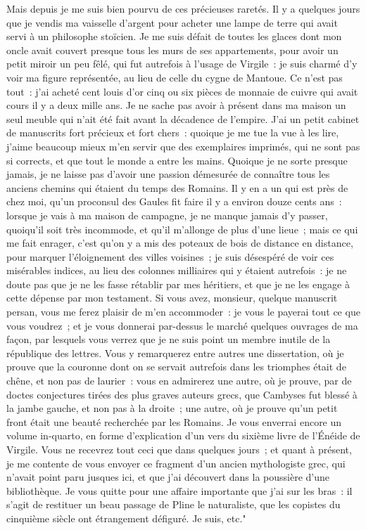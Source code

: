 \documentclass[french,twoside]{book} %
\begin{document}
Mais depuis je me suis bien pourvu de ces précieuses raretés. Il y a quelques jours que je vendis ma vaisselle d’argent pour acheter une lampe de terre qui avait servi à un philosophe stoïcien. Je me suis défait de toutes les glaces dont mon oncle avait couvert presque tous les murs de ses appartements, pour avoir un petit miroir un peu fêlé, qui fut autrefois à l’usage de Virgile : je suis charmé d’y voir ma figure représentée, au lieu de celle du cygne de Mantoue. Ce n’est pas tout : j’ai acheté cent louis d’or cinq ou six pièces de monnaie de cuivre qui avait cours il y a deux mille ans. Je ne sache pas avoir à présent dans ma maison un seul meuble qui n’ait été fait avant la décadence de l’empire. J’ai un petit cabinet de manuscrits fort précieux et fort chers : quoique je me tue la vue à les lire, j’aime beaucoup mieux m’en servir que des exemplaires imprimés, qui ne sont pas si corrects, et que tout le monde a entre les mains. Quoique je ne sorte presque jamais, je ne laisse pas d’avoir une passion démesurée de connaître tous les anciens chemins qui étaient du temps des Romains. Il y en a un qui est près de chez moi, qu’un proconsul des Gaules fit faire il y a environ douze cents ans : lorsque je vais à ma maison de campagne, je ne manque jamais d’y passer, quoiqu’il soit très incommode, et qu’il m’allonge de plus d’une lieue ; mais ce qui me fait enrager, c’est qu’on y a mis des poteaux de bois de distance en distance, pour marquer l’éloignement des villes voisines ; je suis désespéré de voir ces misérables indices, au lieu des colonnes milliaires qui y étaient autrefois : je ne doute pas que je ne les fasse rétablir par mes héritiers, et que je ne les engage à cette dépense par mon testament. Si vous avez, monsieur, quelque manuscrit persan, vous me ferez plaisir de m’en accommoder : je vous le payerai tout ce que vous voudrez ; et je vous donnerai par-dessus le marché quelques ouvrages de ma façon, par lesquels vous verrez que je ne suis point un membre inutile de la république des lettres. Vous y remarquerez entre autres une dissertation, où je prouve que la couronne dont on se servait autrefois dans les triomphes était de chêne, et non pas de laurier : vous en admirerez une autre, où je prouve, par de doctes conjectures tirées des plus graves auteurs grecs, que Cambyses fut blessé à la jambe gauche, et non pas à la droite ; une autre, où je prouve qu’un petit front était une beauté recherchée par les Romains. Je vous enverrai encore un volume in-quarto, en forme d’explication d’un vers du sixième livre de l’Énéide de Virgile. Vous ne recevrez tout ceci que dans quelques jours ; et quant à présent, je me contente de vous envoyer ce fragment d’un ancien mythologiste grec, qui n’avait point paru jusques ici, et que j’ai découvert dans la poussière d’une bibliothèque. Je vous quitte pour une affaire importante que j’ai sur les bras : il s’agit de restituer un beau passage de Pline le naturaliste, que les copistes du cinquième siècle ont étrangement défiguré. Je suis, etc."\par
\end{document}
